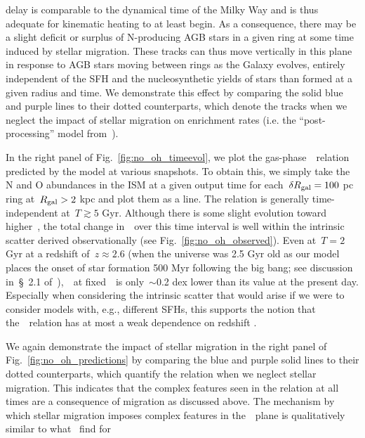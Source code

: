 \documentclass[ms.tex]{subfiles}
\begin{document}
delay is comparable to the dynamical time of the Milky Way and is thus adequate
for kinematic heating to at least begin.
As a consequence, there may be a slight deficit or surplus of N-producing AGB
stars in a given ring at some time induced by stellar migration.
These tracks can thus move vertically in this plane in response to AGB stars
moving between rings as the Galaxy evolves, entirely independent of the SFH and
the nucleosynthetic yields of stars than formed at a given radius and time.
We demonstrate this effect by comparing the solid blue and purple lines to
their dotted counterparts, which denote the tracks when we neglect the impact
of stellar migration on enrichment rates (i.e. the ``post-processing'' model
from~\citealp{Johnson2021}).
\par
In the right panel of Fig.~\ref{fig:no_oh_timeevol}, we plot the
gas-phase~\ohno~relation predicted by the model at various snapshots.
To obtain this, we simply take the N and O abundances in the ISM at a given
output time for each~$\delta R_\text{gal} = 100$ pc ring at~$R_\text{gal} > 2$ kpc and plot
them as a line.
The relation is generally time-independent at~$T \gtrsim 5$ Gyr.
Although there is some slight evolution toward higher~\no, the total change
in~\no~over this time interval is well within the intrinsic scatter derived
observationally (see Fig.~\ref{fig:no_oh_observed}).
Even at~$T = 2$ Gyr at a redshift of~$z \approx 2.6$ (when the universe was
2.5 Gyr old as our model places the onset of star formation 500 Myr following
the big bang; see discussion in~\S~2.1 of~\citealp{Johnson2021}),~\no~at
fixed~\oh~is only~$\sim$0.2 dex lower than its value at the present day.
Especially when considering the intrinsic scatter that would arise if we were
to consider models with, e.g., different SFHs, this supports the notion that
the~\ohno~relation has at most a weak dependence on redshift
\citep{Vincenzo2018, HaydenPawson2021}.
\par
We again demonstrate the impact of stellar migration in the right panel of
Fig.~\ref{fig:no_oh_predictions} by comparing the blue and purple solid lines
to their dotted counterparts, which quantify the relation when we neglect
stellar migration.
This indicates that the complex features seen in the relation at all times are
a consequence of migration as discussed above.
The mechanism by which stellar migration imposes complex features in
the~\ohno~plane is qualitatively similar to what~\citet{Johnson2021} find for
\end{document}
